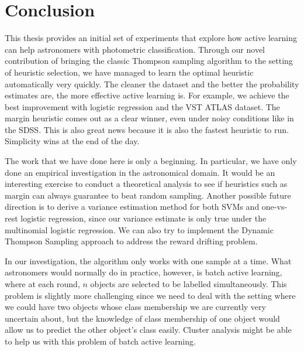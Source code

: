 
\chapter{Conclusion}
\label{cha:conclusion}

This thesis provides an initial set of experiments that explore how active learning can help astronomers with photometric classification. Through our novel contribution of bringing
the classic Thompson sampling algorithm to the setting of heuristic selection, we have managed to
learn the optimal heuristic automatically very quickly. The cleaner the dataset and 
the better the probability estimates are, the more effective active learning is. For example,
we achieve the best improvement with logistic regression and the VST ATLAS dataset. The margin
heuristic comes out as a clear winner, even under noisy conditions like in the SDSS. This
is also great news because it is also the fastest heuristic to run. Simplicity wins at the end of the day.

The work that we have done here is only a beginning. In particular, we have only done an empirical
investigation in the astronomical domain. It would be an interesting exercise to conduct a
theoretical analysis to see if heuristics such as margin can always guarantee to beat random sampling.
Another possible future direction is to derive a variance estimation method for both SVMs and
one-vs-rest logistic regression, since our variance estimate is only true under the multinomial logistic regression. We can also try to implement the Dynamic Thompson Sampling approach to address
the reward drifting problem.

In our investigation, the algorithm only works with one sample at a time. What astronomers would
normally do in practice, however, is batch active learning, where at each round, $n$ objects are selected to be labelled simultaneously. This problem is slightly more challenging since we need to deal with the setting where we could have two objects whose class membership we are currently very uncertain about, but the knowledge of class membership of one object would allow us to predict the other object's class easily. 
Cluster analysis might be able to help us with this problem of batch active learning.

